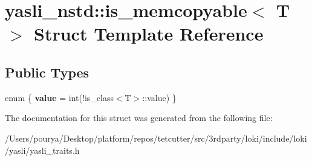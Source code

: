 \hypertarget{structyasli__nstd_1_1is__memcopyable}{}\section{yasli\+\_\+nstd\+:\+:is\+\_\+memcopyable$<$ T $>$ Struct Template Reference}
\label{structyasli__nstd_1_1is__memcopyable}
\subsection*{Public Types}
\begin{DoxyCompactItemize}
\item 
\hypertarget{structyasli__nstd_1_1is__memcopyable_a90e08431a3803643112d7a6ba4793e68}{}enum \{ {\bfseries value} = int(!is\+\_\+class$<$T$>$\+:\+:value)
 \}\label{structyasli__nstd_1_1is__memcopyable_a90e08431a3803643112d7a6ba4793e68}

\end{DoxyCompactItemize}


The documentation for this struct was generated from the following file\+:\begin{DoxyCompactItemize}
\item 
/\+Users/pourya/\+Desktop/platform/repos/tetcutter/src/3rdparty/loki/include/loki/yasli/yasli\+\_\+traits.\+h\end{DoxyCompactItemize}
